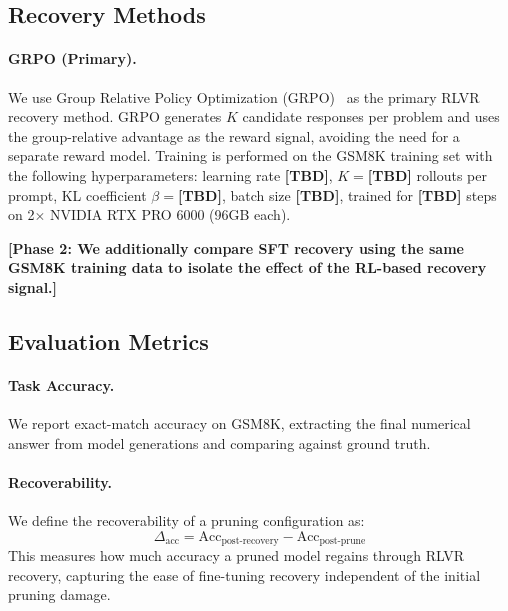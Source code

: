 \subsection{Recovery Methods}

\paragraph{GRPO (Primary).}
We use Group Relative Policy Optimization (GRPO)~\citep{shao2024grpo} as the primary RLVR recovery method.
GRPO generates $K$ candidate responses per problem and uses the group-relative advantage as the reward signal, avoiding the need for a separate reward model.
Training is performed on the GSM8K training set with the following hyperparameters: learning rate \textbf{[TBD]}, $K{=}$\textbf{[TBD]} rollouts per prompt, KL coefficient $\beta{=}$\textbf{[TBD]}, batch size \textbf{[TBD]}, trained for \textbf{[TBD]} steps on 2$\times$ NVIDIA RTX PRO 6000 (96GB each).

\textbf{[Phase 2: We additionally compare SFT recovery using the same GSM8K training data to isolate the effect of the RL-based recovery signal.]}

\subsection{Evaluation Metrics}

\paragraph{Task Accuracy.}
We report exact-match accuracy on GSM8K, extracting the final numerical answer from model generations and comparing against ground truth.

\paragraph{Recoverability.}
We define the recoverability of a pruning configuration as:
\begin{equation}
\Delta_{\text{acc}} = \text{Acc}_{\text{post-recovery}} - \text{Acc}_{\text{post-prune}}
\label{eq:recoverability}
\end{equation}
This measures how much accuracy a pruned model regains through RLVR recovery, capturing the ease of fine-tuning recovery independent of the initial pruning damage.

